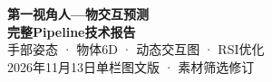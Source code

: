 \documentclass[10pt,a4paper,UTF8,fontset=fandol]{ctexart}
\begin{document}
\begin{center}
{\LARGE\bfseries 第一视角人—物交互预测}\\[7pt]
{\Large\bfseries 完整Pipeline技术报告}\\[8pt]
{\normalsize 手部姿态 · 物体6D · 动态交互图 · RSI优化}\\[5pt]
{\small 2026年11月13日\quad 单栏图文版 · 素材筛选修订}
\end{center}
\end{document}
